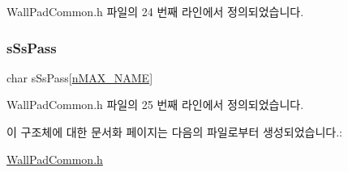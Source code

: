 Wall\+Pad\+Common.\+h 파일의 24 번째 라인에서 정의되었습니다.

\mbox{\label{struct_st_wall_pad_a8c77e9b61d65201646350d01f8a8d7c0}} 
\subsubsection{\texorpdfstring{s\+Ss\+Pass}{sSsPass}}
{\footnotesize\ttfamily char s\+Ss\+Pass\mbox{[}\mbox{\hyperlink{_wall_pad_common_8h_aa1bfef2ce53d431c709ee094aa02ccb6}{n\+M\+A\+X\+\_\+\+N\+A\+ME}}\mbox{]}}



Wall\+Pad\+Common.\+h 파일의 25 번째 라인에서 정의되었습니다.



이 구조체에 대한 문서화 페이지는 다음의 파일로부터 생성되었습니다.\+:\begin{DoxyCompactItemize}
\item 
\mbox{\hyperlink{_wall_pad_common_8h}{Wall\+Pad\+Common.\+h}}\end{DoxyCompactItemize}
